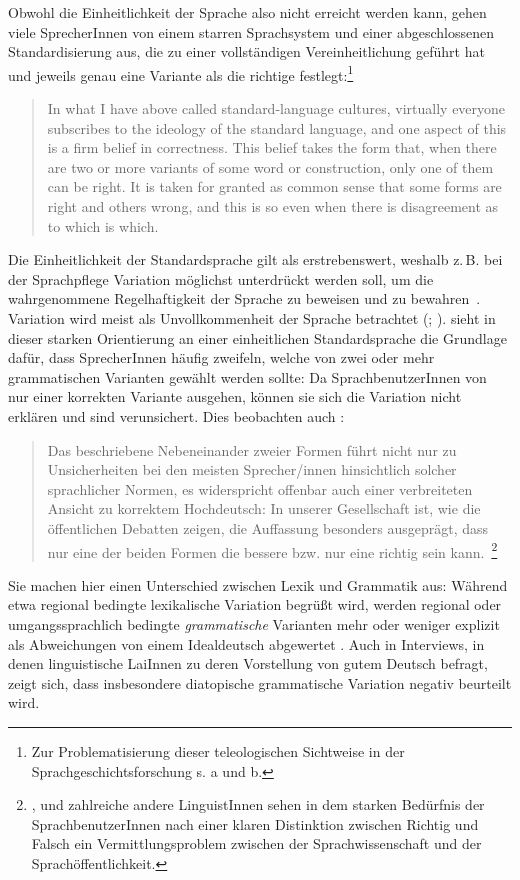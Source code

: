 Obwohl die Einheitlichkeit der Sprache also nicht erreicht werden kann, gehen viele SprecherInnen von einem starren Sprachsystem und einer abgeschlossenen Standardisierung aus, die zu einer vollständigen Vereinheitlichung geführt hat und jeweils genau eine Variante als die richtige festlegt:\footnote{Zur Problematisierung dieser teleologischen Sichtweise in der Sprachgeschichtsforschung s. \citeauthor[]{Elspa2005} \citeyear[]{Elspa.2005}a und \citeyear[]{Elspa2005}b.}
\begin{quote}In what I have above called standard-language cultures, virtually everyone subscribes to the ideology of the standard language, and one aspect of this is a firm belief in correctness. This belief takes the form that, when there are two or more variants of some word or construction, only one of them can be right. It is taken for granted as common sense that some forms are right and others wrong, and this is so even when there is disagreement as to which is which.~\citep[535]{Milroy2001}\end{quote}
Die Einheitlichkeit der Standardsprache gilt als erstrebenswert, weshalb z.\,B. bei der Sprachpflege Variation m{\"o}glichst unterdr{\"u}ckt werden soll, um die wahrgenommene Regelhaftigkeit der Sprache zu beweisen und zu bewahren~\citep[s.][17]{Woolard1998}. 
Variation wird meist als Unvollkommenheit der Sprache betrachtet (\citealp[s.][330]{Langer.}; \citealp[163]{Gal.2016}). 
\citet[16]{Klein2003} sieht in dieser starken Orientierung an einer einheitlichen Standardsprache die Grundlage dafür, dass SprecherInnen häufig zweifeln, welche von zwei oder mehr grammatischen Varianten gewählt werden sollte: Da SprachbenutzerInnen von nur einer korrekten Variante ausgehen, können sie sich die Variation nicht erklären und sind verunsichert.
Dies beobachten auch \citet{Topalovic2008}: 
\begin{quote}
Das beschriebene Nebeneinander zweier Formen führt nicht nur zu Unsicherheiten bei den meisten Sprecher/innen hinsichtlich solcher sprachlicher Normen, es widerspricht offenbar auch einer verbreiteten Ansicht zu \glq korrektem Hochdeutsch\grq: In unserer Gesellschaft ist, wie die öffentlichen Debatten zeigen, die Auffassung besonders ausgeprägt, dass nur eine der beiden Formen die bessere bzw. nur eine \glq richtig\grq{} sein kann.~\citep[41]{Topalovic2008}\footnote{\citet{Topalovic2008}, \citet{Hennig2009} und zahlreiche andere LinguistInnen sehen in dem starken Bedürfnis der SprachbenutzerInnen nach einer klaren Distinktion zwischen Richtig und Falsch ein Vermittlungsproblem zwischen der Sprachwissenschaft und der Sprachöffentlichkeit.}\end{quote}
Sie machen hier einen Unterschied zwischen Lexik und Grammatik aus: Während etwa regional bedingte lexikalische Variation begrüßt wird, werden \glqq regional oder umgangssprachlich bedingte \textit{grammatische} Varianten mehr oder weniger explizit als Abweichungen von einem \glq Idealdeutsch\grq{} abgewertet\grqq{} \citep[46, Hervorhebung im Original]{Topalovic2008}. 
Auch in Interviews, in denen \citet{Beuge2017} linguistische LaiInnen zu deren Vorstellung von gutem Deutsch befragt, zeigt sich, dass insbesondere diatopische grammatische Variation negativ beurteilt wird.

